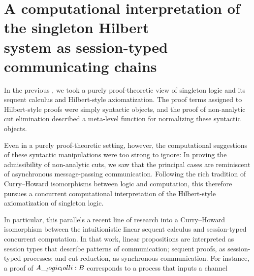 \chapter{A computational interpretation of the singleton Hilbert\\system as session-typed communicating chains}\label{ch:process-chains}

In the previous , we took a purely proof-theoretic view of singleton logic and its sequent calculus and Hilbert-style axiomatization.
The proof terms assigned to Hilbert-style proofs were simply syntactic objects,
and the proof of non-analytic cut elimination described a meta-level function for normalizing these syntactic objects.

Even in a purely proof-theoretic setting, however, the computational suggestions of these syntactic manipulations were too strong to ignore:
In proving the admissibility of non-analytic cuts,
we saw that the principal cases
are reminiscent of asynchronous message-passing communication.
Following the rich tradition of Curry--Howard isomorphisms between logic and computation, this  therefore pursues a concurrent computational interpretation of the Hilbert-style axiomatization of singleton logic.


In particular, this parallels a recent line of research into a Curry--Howard isomorphism between the intuitionistic linear sequent calculus and session-typed concurrent computation\autocites{Caires+:MSCS13}{Caires+:TLDI12}.
In that work, linear propositions are interpreted as session types that describe patterns of communication; sequent proofs, as session-typed processes; and cut reduction, as synchronous communication.
For instance, a proof of $A \__logic_lolli: B$ corresponds to a process that inputs a channel


